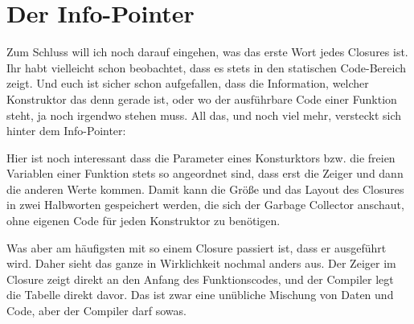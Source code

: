 \documentclass[11pt,DIV=12,parskip=half,headings=normal,abstract]{scrartcl}
\begin{document}
\section{Der Info-Pointer}

Zum Schluss will ich noch darauf eingehen, was das erste Wort jedes Closures ist. Ihr habt vielleicht schon beobachtet, dass es stets in den statischen Code-Bereich zeigt. Und euch ist sicher schon aufgefallen, dass die Information, welcher Konstruktor das denn gerade ist, oder wo der ausführbare Code einer Funktion steht, ja noch irgendwo stehen muss. All das, und noch viel mehr, versteckt sich hinter dem Info-Pointer:

\def\ux{2.8cm}\def\uy{0.6cm}
\begin{center}
\end{center}

Hier ist noch interessant dass die Parameter eines Konsturktors bzw. die freien Variablen einer Funktion stets so angeordnet sind, dass erst die Zeiger und dann die anderen Werte kommen. Damit kann die Größe und das Layout des Closures in zwei Halbworten gespeichert werden, die sich der Garbage Collector anschaut, ohne eigenen Code für jeden Konstruktor zu benötigen.

Was aber am häufigsten mit so einem Closure passiert ist, dass er ausgeführt wird. Daher sieht das ganze in Wirklichkeit nochmal anders aus. Der Zeiger im Closure zeigt direkt an den Anfang des Funktionscodes, und der Compiler legt die Tabelle direkt davor. Das ist zwar eine unübliche Mischung von Daten und Code, aber der Compiler darf sowas.
\end{document}
